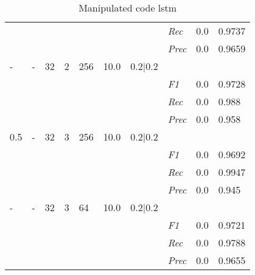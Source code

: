 \begin{table}[]
\begin{tabularx}{\textwidth}{XXXXXXX|X|X|X}
& & & & & & & \textit{Rec} &  0.0 & 0.9737    \\
& & & & & & & \textit{Prec} & 0.0 & 0.9659  \\ \midrule
- & - & 32 & 2 & 256 &10.0 & 0.2|0.2 & & & \\
& & & & & & & \textit{F1} & 0.0 & 0.9728        \\
& & & & & & & \textit{Rec} &  0.0 & 0.988    \\
& & & & & & & \textit{Prec} & 0.0 & 0.958  \\ \midrule
0.5 & - & 32 & 3 & 256 &10.0 & 0.2|0.2 & & & \\
& & & & & & & \textit{F1} & 0.0 & 0.9692        \\
& & & & & & & \textit{Rec} &  0.0 & 0.9947    \\
& & & & & & & \textit{Prec} & 0.0 & 0.945  \\ \midrule
- & - & 32 & 3 & 64 &10.0 & 0.2|0.2 & & & \\
& & & & & & & \textit{F1} & 0.0 & 0.9721        \\
& & & & & & & \textit{Rec} &  0.0 & 0.9788    \\
& & & & & & & \textit{Prec} & 0.0 & 0.9655  \\ \midrule
\end{tabularx}
\caption{Manipulated code lstm}
\label{tab:rq3_lstm}
\end{table}